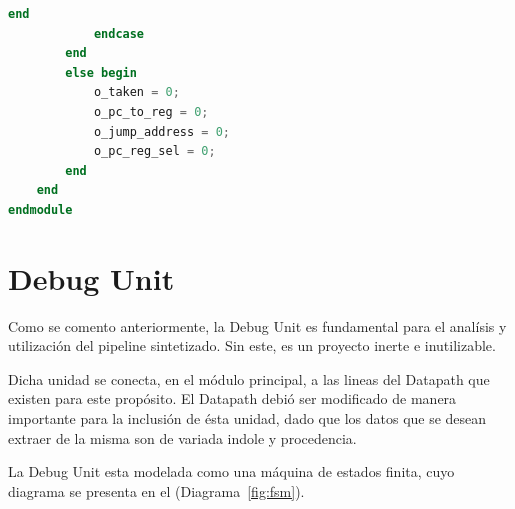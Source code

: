 \documentclass[12pt]{article}
\begin{document}
\begin{lstlisting}[language=verilog]
                end
            endcase
        end
        else begin
            o_taken = 0;
            o_pc_to_reg = 0;
            o_jump_address = 0;
            o_pc_reg_sel = 0;
        end
    end
endmodule
\end{lstlisting}

\section{Debug Unit}

Como se comento anteriormente, la Debug Unit es fundamental para el analísis y utilización del pipeline sintetizado. Sin este, es un proyecto inerte e inutilizable.

Dicha unidad se conecta, en el módulo principal, a las lineas del Datapath que existen para este propósito. El Datapath debió ser modificado de manera importante para la inclusión de ésta unidad, dado que los datos que se desean extraer de la misma son de variada indole y procedencia.

La Debug Unit esta modelada como una máquina de estados finita, cuyo diagrama se presenta en el (Diagrama~\ref{fig:fsm}).
\end{document}
